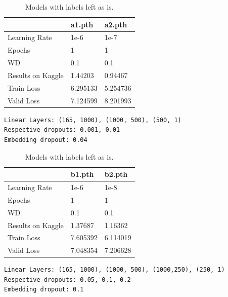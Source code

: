 \documentclass[10pt,twocolumn,letterpaper]{article}
\begin{document}
\begin{table}[]
  \begin{center}
    \begin{tabular}{|l|l|l|}
    \hline
                      & a1.pth   & a2.pth   \\ \hline
    Learning Rate     & 1e-6     & 1e-7     \\ \hline
    Epochs            & 1        & 1        \\ \hline
    WD                & 0.1      & 0.1      \\ \hline
    Results on Kaggle & 1.44203  & 0.94467  \\ \hline
    Train Loss        & 6.295133 & 5.254736 \\ \hline
    Valid Loss        & 7.124599 & 8.201993 \\ \hline
    \end{tabular}
    {\scriptsize
    \begin{verbatim}
Linear Layers: (165, 1000), (1000, 500), (500, 1)
Respective dropouts: 0.001, 0.01
Embedding dropout: 0.04
    \end{verbatim}}
  \end{center}
  \caption{Models with labels left as is.}
\end{table}

\begin{table}[]
  \begin{center}
    \begin{tabular}{|l|l|l|}
    \hline
                      & b1.pth   & b2.pth   \\ \hline
    Learning Rate     & 1e-6     & 1e-8     \\ \hline
    Epochs            & 1        & 1        \\ \hline
    WD                & 0.1      & 0.1      \\ \hline
    Results on Kaggle & 1.37687  & 1.16362  \\ \hline
    Train Loss        & 7.605392 & 6.114019 \\ \hline
    Valid Loss        & 7.048354 & 7.206628 \\ \hline
    \end{tabular}
    {\scriptsize
    \begin{verbatim}
Linear Layers: (165, 1000), (1000, 500), (1000,250), (250, 1)
Respective dropouts: 0.05, 0.1, 0.2
Embedding dropout: 0.1
    \end{verbatim}}
  \end{center}
  \caption{Models with labels left as is.}
\end{table}
\end{document}
